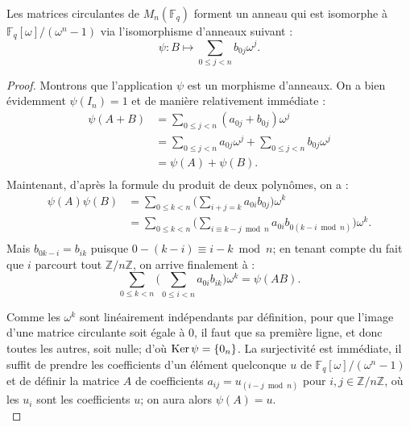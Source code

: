 \documentclass[a4paper]{article} %
\numberwithin{section}{part}
\numberwithin{equation}{section}
\newcommand\zmodn[1]{\mathbb{Z}/#1\mathbb{Z}}
\newcommand\GF[1]{\mathbb{F}_{#1}}
\begin{document}
\begin{thm}
\label{th:matcirciso}
Les matrices circulantes de $M_n(\GF{q})$ forment un anneau qui est isomorphe à 
$\mathbb{F}_q[\omega]/(\omega^n - 1)$ \textup{via} l'isomorphisme d'anneaux
suivant :
\begin{equation*}
\label{eq:isomconvert}
\psi : B \longmapsto \sum_{0\leq j < n}{b_{0j}\omega^j}.
\end{equation*}
\end{thm}
\begin{proof}
Montrons que l'application $\psi$ est un morphisme d'anneaux. On a bien 
évidemment $\psi(I_n) = 1$ et de manière relativement immédiate :
\begin{align*}
\psi(A + B) &= \sum_{0\leq j < n}{(a_{0j} + b_{0j})\omega^j}\\
&= \sum_{0\leq j < n}{a_{0j}\omega^j} + \sum_{0\leq j < n}{b_{0j}\omega^j}\\
&= \psi(A) + \psi(B).\\
\end{align*}
Maintenant, d'après la formule du produit de deux polynômes, on a :
\begin{align*}
\psi(A)\psi(B) &= \sum_{0\leq k < n}
{\bigg(\sum_{i+j=k}{a_{0i}b_{0j}}\bigg)\omega^k}\\
&= \sum_{0\leq k < n}{\bigg(\sum_{i\equiv k-j \bmod n}{a_{0i}b_{0(k-i \bmod n)}}
\bigg)\omega^k}.\\
\end{align*}
Mais $b_{0k-i} = b_{ik}$ puisque $0 -(k-i) \equiv i-k \bmod n$; en tenant compte
du fait que $i$ parcourt tout $\zmodn{n}$, on arrive finalement à :
\[\sum_{0\leq k < n}{\bigg(\sum_{0\leq i < n}{a_{0i}b_{ik}}\bigg)\omega^k} = 
\psi(AB).\]\par
Comme les $\omega^k$ sont linéairement indépendants par définition, pour que 
l'image d'une matrice circulante soit égale à $0$, il faut que sa première 
ligne, et donc toutes les autres, soit nulle; d'où $\textup{Ker}\,\psi = 
\{0_n\}$. La surjectivité est immédiate, il suffit de prendre les coefficients 
d'un élément quelconque $u$ de $\GF{q}[\omega]/(\omega^n - 1)$ et de définir la 
matrice $A$ de coefficients $a_{ij} = u_{(i-j \bmod n)}$ pour $i,j\in\zmodn{n}$,
où les $u_i$ sont les coefficients $u$; on aura alors $\psi(A) = u$.\\
\end{proof}
\end{document}
